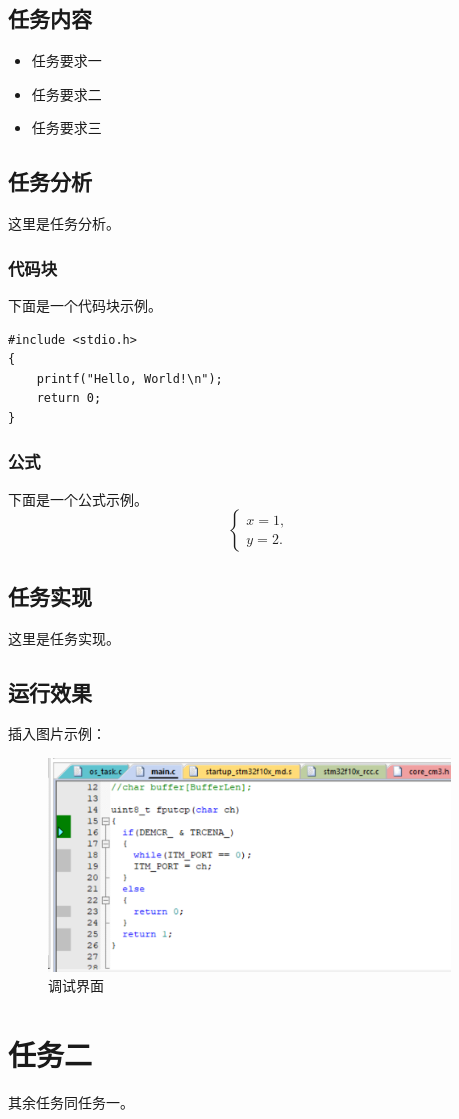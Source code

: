 \documentclass[UTF8]{ctexart}
\begin{document}
\subsection{任务内容}
\begin{itemize}
    \item 任务要求一
    \item 任务要求二
    \item 任务要求三
\end{itemize}

\subsection{任务分析}
这里是任务分析。
\subsubsection{代码块}
下面是一个代码块示例。
\begin{lstlisting}
#include <stdio.h>
{
    printf("Hello, World!\n");
    return 0;
}
\end{lstlisting}

\subsubsection{公式}
下面是一个公式示例。
\begin{equation}
    \begin{cases}
        x = 1, \\
        y = 2.
    \end{cases}
\end{equation}

\subsection{任务实现}
这里是任务实现。
\subsection{运行效果}
插入图片示例：
\begin{figure}[H]
    \centering
    \includegraphics[width=0.95\textwidth]{picture/example.png}%
    \caption{调试界面}
\end{figure}

\section{任务二}
其余任务同任务一。
\end{document}
